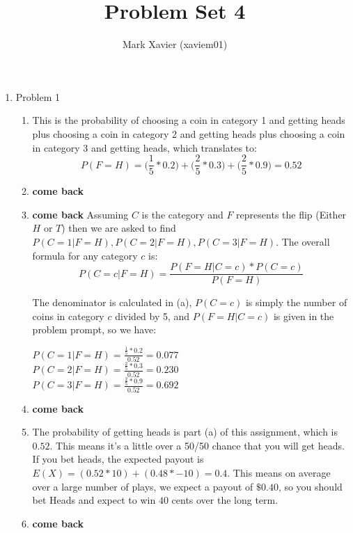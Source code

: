 \documentclass{article}
\title{Problem Set 4}
\author{Mark Xavier (xaviem01)}
\begin{document}
	\maketitle
	
	\begin{enumerate}
		\item Problem 1
			\begin{enumerate}
				\item This is the probability of choosing a coin in category 1 and getting heads plus choosing a coin in category 2 and getting heads plus choosing a coin in category 3 and getting heads, which translates to:
				$$P(F=H) = \bigg(\frac{1}{5} * 0.2\bigg) + \bigg(\frac{2}{5} * 0.3\bigg) + \bigg(\frac{2}{5} * 0.9\bigg) = 0.52$$
				
				\item \textbf{come back}
				
				\item \textbf{come back} Assuming $C$ is the category and $F$ represents the flip (Either $H$ or $T$) then we are asked to find $P(C=1 | F=H), P(C=2 | F=H), P(C=3 | F=H)$.  The overall formula for any category $c$ is:
				$$P(C=c | F=H) = \frac{P(F=H | C=c) * P(C=c)}{P(F=H)}$$
				
				The denominator is calculated in (a), $P(C=c)$ is simply the number of coins in category $c$ divided by 5, and $P(F=H | C=c)$ is given in the problem prompt, so we have:
				
				$P(C=1 | F=H) = \frac{\frac{1}{5} * 0.2}{0.52} = 0.077$\\
				$P(C=2 | F=H) = \frac{\frac{2}{5} * 0.3}{0.52} = 0.230$\\
				$P(C=3 | F=H) = \frac{\frac{2}{5} * 0.9}{0.52} = 0.692$\\
				
				\item \textbf{come back}
				
				\item The probability of getting heads is part (a) of this assignment, which is $0.52$.  This means it's a little over a 50/50 chance that you will get heads.  If you bet heads, the expected payout is $E(X) = (0.52 * 10) + (0.48 * -10) = 0.4$.  This means on average over a large number of plays, we expect a payout of $\$0.40$, so you should bet Heads and expect to win $40$ cents over the long term.
				
				\item \textbf{come back}
			\end{enumerate}
	\end{enumerate}
\end{document}
